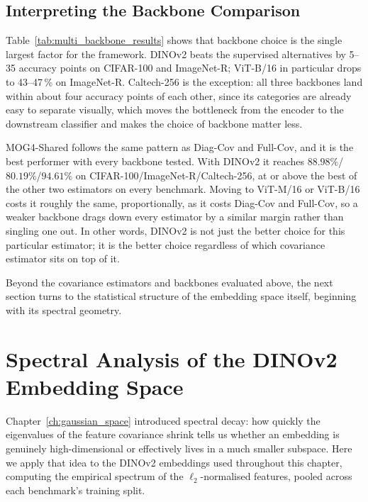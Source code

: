 \subsection{Interpreting the Backbone Comparison}
\label{sec:an:backbone}

Table~\ref{tab:multi_backbone_results} shows that backbone choice is the single largest factor for the framework. DINOv2 beats the supervised alternatives by 5--35 accuracy points on CIFAR-100 and ImageNet-R; ViT-B/16 in particular drops to 43--47\,\% on ImageNet-R. Caltech-256 is the exception: all three backbones land within about four accuracy points of each other, since its categories are already easy to separate visually, which moves the bottleneck from the encoder to the downstream classifier and makes the choice of backbone matter less.

MOG4-Shared follows the same pattern as Diag-Cov and Full-Cov, and it is the best performer with every backbone tested. With DINOv2 it reaches $88.98\%$/$80.19\%$/$94.61\%$ on CIFAR-100/ImageNet-R/Caltech-256, at or above the best of the other two estimators on every benchmark. Moving to ViT-M/16 or ViT-B/16 costs it roughly the same, proportionally, as it costs Diag-Cov and Full-Cov, so a weaker backbone drags down every estimator by a similar margin rather than singling one out. In other words, DINOv2 is not just the better choice for this particular estimator; it is the better choice regardless of which covariance estimator sits on top of it.

Beyond the covariance estimators and backbones evaluated above, the next section turns to the statistical structure of the embedding space itself, beginning with its spectral geometry.

\section{Spectral Analysis of the DINOv2 Embedding Space}
\label{sec:spectral_analysis}
\label{sec:pca_results}
\label{sec:an:embedding}

Chapter~\ref{ch:gaussian_space} introduced spectral decay: how quickly the eigenvalues of the feature covariance shrink tells us whether an embedding is genuinely high-dimensional or effectively lives in a much smaller subspace. Here we apply that idea to the DINOv2 embeddings used throughout this chapter, computing the empirical spectrum of the $\ell_2$-normalised features, pooled across each benchmark's training split.

